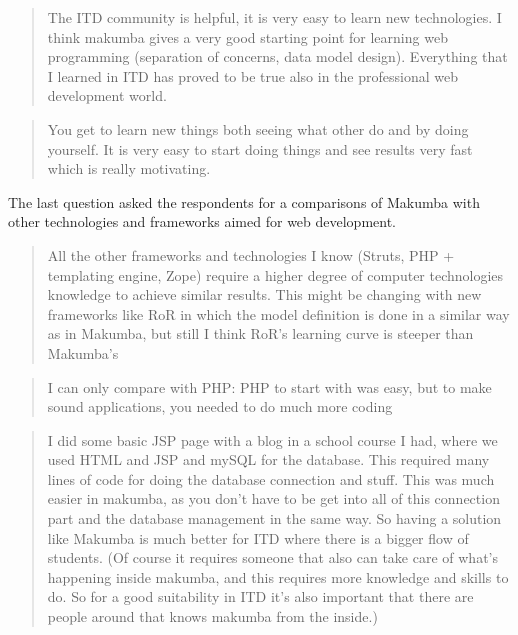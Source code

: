 \documentclass{acm_proc_article-sp}
\begin{document}
\begin{quotation}
	The ITD community is helpful, it is very easy to learn new technologies. I think makumba gives a very good starting point for learning web programming (separation of concerns, data model design). Everything that I learned in ITD has proved to be true also in the professional web development world. 
\end{quotation}

\begin{quotation}
	You get to learn new things both seeing what other do and by doing yourself. It is very easy to start doing things and see results very fast which is really motivating. 
\end{quotation}


The last question asked the respondents for a comparisons of Makumba with other technologies and frameworks aimed for web development.

\begin{quotation}
	All the other frameworks and technologies I know (Struts, PHP + templating engine, Zope) require a higher degree of computer technologies knowledge to achieve similar results. This might be changing with new frameworks like RoR in which the model definition is done in a similar way as in Makumba, but still I think RoR's learning curve is steeper than Makumba's 
\end{quotation}

\begin{quotation}
	I can only compare with PHP: PHP to start with was easy, but to make sound applications, you needed to do much more coding 
\end{quotation}

\begin{quotation}
	I did some basic JSP page with a blog in a school course I had, where we used HTML and JSP and mySQL for the database. This required many lines of code for doing the database connection and stuff. This was much easier in makumba, as you don't have to be get into all of this connection part and the database management in the same way. So having a solution like Makumba is much better for ITD where there is a bigger flow of students.
	(Of course it requires someone that also can take care of what's happening inside makumba, and this requires more knowledge and skills to do. So for a good suitability in ITD it's also important that there are people around that knows makumba from the inside.)
\end{quotation}
\end{document}
